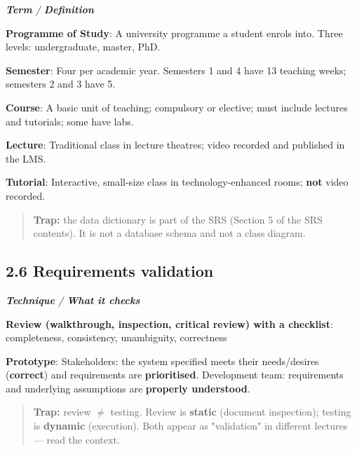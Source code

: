 \begin{studycolumns}
\begin{referenceentries}
\textit{\textbf{Term} / \textbf{Definition}}\par\smallskip
\noindent \textbf{Programme of Study}: A university programme a student enrols into. Three levels: undergraduate, master, PhD.\par
\noindent \textbf{Semester}: Four per academic year. Semesters 1 and 4 have 13 teaching weeks; semesters 2 and 3 have 5.\par
\noindent \textbf{Course}: A basic unit of teaching; compulsory or elective; must include lectures and tutorials; some have labs.\par
\noindent \textbf{Lecture}: Traditional class in lecture theatres; video recorded and published in the LMS.\par
\noindent \textbf{Tutorial}: Interactive, small-size class in technology-enhanced rooms; \textbf{not} video recorded.\par
\end{referenceentries}

\begin{quote}\small\color{navy}
\textbf{Trap:} the data dictionary is part of the SRS (Section 5 of the SRS contents). It is not a database schema and not a class diagram.

\end{quote}
\subsection*{2.6 Requirements validation}

\begin{referenceentries}
\textit{\textbf{Technique} / \textbf{What it checks}}\par\smallskip
\noindent \textbf{\textbf{Review} (walkthrough, inspection, critical review) with a checklist}: completeness, consistency, unambiguity, correctness\par
\noindent \textbf{\textbf{Prototype}}: Stakeholders: the system specified meets their needs/\allowbreak{}desires (\textbf{correct}) and requirements are \textbf{prioritised}. Development team: requirements and underlying assumptions are \textbf{properly understood}.\par
\end{referenceentries}

\begin{quote}\small\color{navy}
\textbf{Trap:} review \ensuremath{\neq} testing. Review is \textbf{static} (document inspection); testing is \textbf{dynamic} (execution). Both appear as "validation" in different lectures --- read the context.


\end{quote}
\end{studycolumns}
